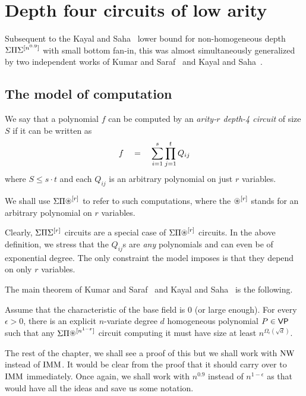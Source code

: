 \chapter{Depth four circuits of low arity}

Subsequent to the Kayal and Saha~\cite{KayalSaha14} lower bound for non-homogeneous depth $\Sigma\Pi\Sigma^{[n^{0.9}]}$ with small bottom fan-in, this was almost simultaneously generalized by two independent works of Kumar and Saraf~\cite{KumarSaraf15} and Kayal and Saha~\cite{KayalSaha15}.

\section{The model of computation}

\begin{definition} We say that a polynomial $f$ can be computed by an \emph{arity-$r$ depth-4 circuit} of size $S$ if it can be written as
\[
f \quad = \quad \sum_{i=1}^s \prod_{j=1}^t Q_{ij}
\]
where $S \leq s \cdot t$ and each $Q_{ij}$ is an arbitrary polynomial on just $r$ variables. 

We shall use $\SPA^{[r]}$ to refer to such computations, where the $\circast^{[r]}$ stands for an arbitrary polynomial on $r$ variables. 
\end{definition}

Clearly, $\Sigma\Pi\Sigma^{[r]}$ circuits are a special case of $\SPA^{[r]}$ circuits. In the above definition, we stress that the $Q_{ij}$s are \emph{any} polynomials and can even be of exponential degree. The only constraint the model imposes is that they depend on only $r$ variables. 

The main theorem of Kumar and Saraf~\cite{KumarSaraf15} and Kayal and Saha~\cite{KayalSaha15} is the following.

\begin{theorem}\label{thm:low-arity-lb} Assume that the characteristic of the base field is $0$ (or large enough). For every $\epsilon > 0$, there is an explicit $n$-variate degree $d$ homogeneous polynomial $P \in \mathsf{VP}$ such that any $\SPA^{[n^{1-\epsilon}]}$ circuit computing it must have size at least $n^{\Omega_\epsilon(\sqrt{d})}$. 
\end{theorem}

The rest of the chapter, we shall see a proof of this but we shall work with $\operatorname{\mathrm{NW}}$ instead of $\operatorname{\mathrm{IMM}}$. It would be clear from the proof that it should carry over to $\operatorname{\mathrm{IMM}}$ immediately. Once again, we shall work with $n^{0.9}$ instead of $n^{1-\epsilon}$ as that would have all the ideas and save us some notation. 

